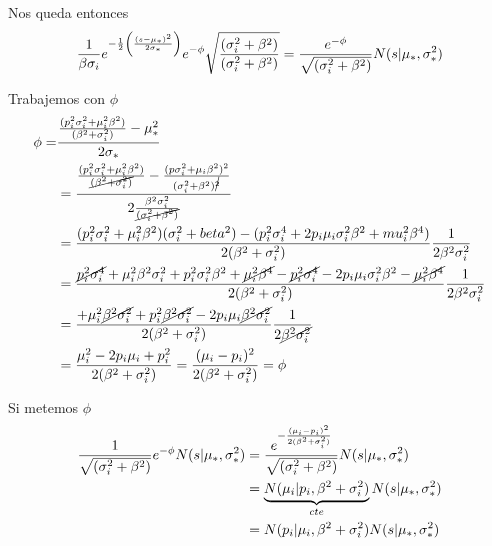 \documentclass[11pt,twoside,spanish]{report} %
\begin{document}
Nos queda entonces
\begin{equation}
	\centering
	\frac{1}{\beta\sigma_i}e^{-\frac{1}{2}\left( \frac{(s-\mu_{\ast})^2}{2\sigma_{\ast}}\right)}e^{-\phi}\sqrt{\frac{(\sigma_i^2+\beta^2)}{(\sigma_i^2+\beta^2)}}
	= \frac{e^{-\phi}}{\sqrt{(\sigma_i^2+\beta^2)}}N(s \vert\mu_{\ast},\sigma_{\ast}^2)
\end{equation}

Trabajemos con $\phi$
\begin{equation}
	\centering
	\begin{split}
		\phi = & \frac{\frac{(p_i^2\sigma_i^2+\mu_i^2\beta^2)}{(\beta^2+\sigma_i^2)}-\mu_{\ast}^2}{2\sigma_{\ast}}\\
		& = \frac{\frac{(p_i^2\sigma_i^2+\mu_i^2\beta^2)}{\cancel{(\beta^2+\sigma_i^{2})}}-\frac{(p\sigma_i^2+\mu_i\beta^2)^2}{(\sigma_i^2+\beta^2)^{\cancel{2}}}}{2\frac{\beta^2\sigma_i^2}{\cancel{(\sigma_i^2+\beta^2)}}}\\
		& =\frac{(p_i^2\sigma_i^2+\mu_i^2\beta^2)(\sigma_i^2+beta^2)-(p_i^2\sigma_i^4+2p_i\mu_i\sigma_i^2\beta^2+mu_i^2\beta^4)}{2(\beta^2+\sigma_i^2)}\frac{1}{2\beta^2\sigma_i^2}\\
		& = \frac{\cancel{p_i^2\sigma_i^4}+\mu_i^2\beta^2\sigma_i^2+p_i^2\sigma_i^2\beta^2+\cancel{\mu_i^2\beta^4}-\cancel{p_i^2\sigma_i^4}-2p_i\mu_i\sigma_i^2\beta^2-\cancel{\mu_i^2\beta^4}}{2(\beta^2+\sigma_i^2)}\frac{1}{2\beta^2\sigma_i^2}\\
		& = \frac{+\mu_i^2\cancel{\beta^2\sigma_i^2}+p_i^2\cancel{\beta^2\sigma_i^2}-2p_i\mu_i\cancel{\beta^2\sigma_i^2}}{2(\beta^2+\sigma_i^2)}\frac{1}{2\cancel{\beta^2\sigma_i^2}}\\
		& = \frac{\mu_i^2-2p_i\mu_i+p_i^2}{2(\beta^2+\sigma_i^2)} = \frac{(\mu_i-p_i)^2}{2(\beta^2+\sigma_i^2)} = \phi
	\end{split}
\end{equation}

Si metemos $\phi$
\begin{equation}
	\centering
	\begin{split}
		\frac{1}{\sqrt{(\sigma_i^2+\beta^2)}}e^{-\phi}N(s \vert\mu_{\ast},\sigma_{\ast}^2)
		& =\frac{e^{-\frac{(\mu_i-p_i)^2}{2(\beta^2+\sigma_i^2)}}}{\sqrt{(\sigma_i^2+\beta^2)}}N(s \vert\mu_{\ast},\sigma_{\ast}^2)\\
		& = \underbrace{N(\mu_i\vert p_i,\beta^2+\sigma_i^2)}_{cte}N(s \vert\mu_{\ast},\sigma_{\ast}^2)\\
		& = N(p_i\vert \mu_i,\beta^2+\sigma_i^2)N(s \vert\mu_{\ast},\sigma_{\ast}^2)
	\end{split}
\end{equation}
\end{document}
